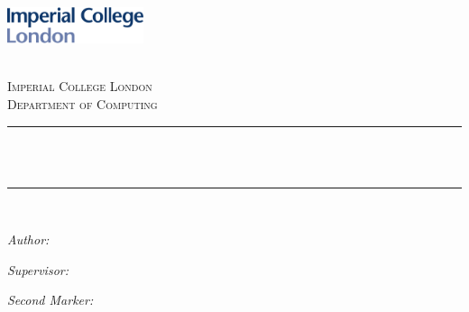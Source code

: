 \begin{titlepage}

\newcommand{\HRule}{\rule{\linewidth}{0.5mm}} %



\includegraphics[width = 4cm]{./figures/imperial}\\[0.5cm] 

\begin{center} %

\textsc{\LARGE \reporttype}\\[1.5cm] 
\textsc{\Large Imperial College London}\\[0.5cm] 
\textsc{\large Department of Computing}\\[0.5cm] 

\HRule \\[0.4cm]
{
\huge \bfseries \reporttitle
}\\ %
\HRule \\[1.5cm]
\end{center}

\noindent
\begin{minipage}{.5\linewidth}
\begin{flushleft} \large
\textit{Author:}\\
\reportauthor
\end{flushleft}
\end{minipage}%
\begin{minipage}{.5\linewidth}
\begin{flushright} \large
\textit{Supervisor:}\\
\supervisor
\end{flushright}
\begin{flushright} \large
\textit{Second Marker:}\\
\sndmarker
\end{flushright}
\end{minipage}

\vspace{2cm}
\makeatletter
\centering
\@date 


\vfill %



\makeatother


\end{titlepage}

